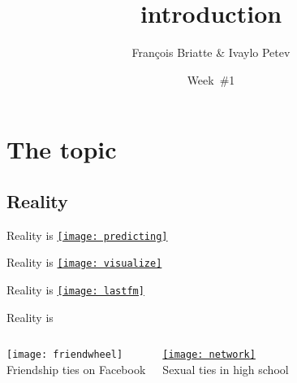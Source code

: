 \documentclass[t]{beamer}
\title{introduction}
\author{François Briatte \& Ivaylo Petev}
\date{Week~\#1}
\begin{document}
	
	\section{The topic}
	
  \subsection{Reality}
  
  \begin{frame}[t]{Reality is }
    \href{http://articles.latimes.com/2010/aug/21/local/la-me-predictcrime-20100427-1}{\texttt{[image: predicting]}}
  \end{frame}
    
  \begin{frame}[t]{Reality is }
    \href{http://www.bricoleurbanism.org/whimsicality/urban-fabric-form-comparison/}{\texttt{[image: visualize]}}
  \end{frame}
  
  \begin{frame}[t]{Reality is }
    \href{http://www.last.fm/user/phnk1/library}{\texttt{[image: lastfm]}}
  \end{frame}

  \begin{frame}[c]{Reality is }

    \begin{columns}[T]


      \begin{center}
        \texttt{[image: friendwheel]}\\
        \vspace{0.74cm}
        Friendship ties on Facebook
      \end{center}


      \begin{center}
        \href{http://www.sociology.columbia.edu/pdf-files/bearmanarticle.pdf}{\texttt{[image: network]}}\\
        \vspace{0.7cm}
        Sexual ties in high school
      \end{center}

    \end{columns}

  \end{frame}
  
\end{document}
